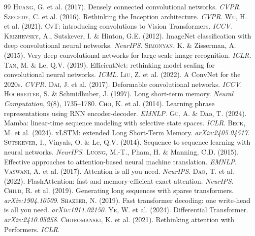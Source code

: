 \documentclass[12pt,a4paper,twoside]{book}
\theoremstyle{definition}
\theoremstyle{plain}
\theoremstyle{remark}
\begin{document}
\begin{thebibliography}{99}
 \textsc{Huang}, G. et al. (2017). Densely connected convolutional networks. \emph{CVPR}.
 \textsc{Szegedy}, C. et al. (2016). Rethinking the Inception architecture. \emph{CVPR}.
 \textsc{Wu}, H. et al. (2021). CvT: introducing convolutions to Vision Transformers. \emph{ICCV}.
 \textsc{Krizhevsky}, A., Sutskever, I. \& Hinton, G.E. (2012). ImageNet classification with deep convolutional neural networks. \emph{NeurIPS}.
 \textsc{Simonyan}, K. \& Zisserman, A. (2015). Very deep convolutional networks for large-scale image recognition. \emph{ICLR}.
 \textsc{Tan}, M. \& Le, Q.V. (2019). EfficientNet: rethinking model scaling for convolutional neural networks. \emph{ICML}.
 \textsc{Liu}, Z. et al. (2022). A ConvNet for the 2020s. \emph{CVPR}.
 \textsc{Dai}, J. et al. (2017). Deformable convolutional networks. \emph{ICCV}.
 \textsc{Hochreiter}, S. \& Schmidhuber, J. (1997). Long short-term memory. \emph{Neural Computation}, 9(8), 1735--1780.
 \textsc{Cho}, K. et al. (2014). Learning phrase representations using RNN encoder-decoder. \emph{EMNLP}.
 \textsc{Gu}, A. \& Dao, T. (2024). Mamba: linear-time sequence modeling with selective state spaces. \emph{ICLR}.
 \textsc{Beck}, M. et al. (2024). xLSTM: extended Long Short-Term Memory. \emph{arXiv:2405.04517}.
 \textsc{Sutskever}, I., Vinyals, O. \& Le, Q.V. (2014). Sequence to sequence learning with neural networks. \emph{NeurIPS}.
 \textsc{Luong}, M.-T., Pham, H. \& Manning, C.D. (2015). Effective approaches to attention-based neural machine translation. \emph{EMNLP}.
 \textsc{Vaswani}, A. et al. (2017). Attention is all you need. \emph{NeurIPS}.
 \textsc{Dao}, T. et al. (2022). FlashAttention: fast and memory-efficient exact attention. \emph{NeurIPS}.
 \textsc{Child}, R. et al. (2019). Generating long sequences with sparse transformers. \emph{arXiv:1904.10509}.
 \textsc{Shazeer}, N. (2019). Fast transformer decoding: one write-head is all you need. \emph{arXiv:1911.02150}.
 \textsc{Ye}, W. et al. (2024). Differential Transformer. \emph{arXiv:2410.05258}.
 \textsc{Choromanski}, K. et al. (2021). Rethinking attention with Performers. \emph{ICLR}.
\end{thebibliography}

\printindex
\end{document}
